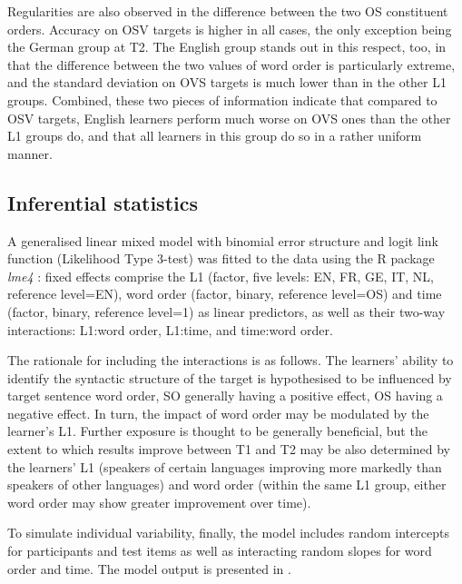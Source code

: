 Regularities are also observed in the difference between the two OS constituent orders. Accuracy on OSV targets is higher in all cases, the only exception being the German group at T2. The English group stands out in this respect, too, in that the difference between the two values of word order is particularly extreme, and the standard deviation on OVS targets is much lower than in the other L1 groups. Combined, these two pieces of information indicate that compared to OSV targets, English learners perform much worse on OVS ones than the other L1 groups do, and that all learners in this group do so in a rather uniform manner. 

\subsection{Inferential statistics}\label{sec:05:2.2}

A generalised linear mixed model with binomial error structure and logit link function (Likelihood Type 3-test) was fitted to the data using the R package \textit{lme4} \citep{BatesEtAl2015}: fixed effects comprise the L1 (factor, five levels: EN, FR, GE, IT, NL, reference level=EN), word order (factor, binary, reference level=OS) and time (factor, binary, reference level=1) as linear predictors, as well as their two-way interactions: L1:word order, L1:time, and time:word order. 

The rationale for including the interactions is as follows. The learners' ability to identify the syntactic structure of the target is hypothesised to be influenced by target sentence word order, SO generally having a positive effect, OS having a negative effect. In turn, the impact of word order may be modulated by the learner’s L1. Further exposure is thought to be generally beneficial, but the extent to which results improve between T1 and T2 may be also determined by the learners’ L1 (speakers of certain languages improving more markedly than speakers of other languages) and word order (within the same L1 group, either word order may show greater improvement over time). 

To simulate individual variability, finally, the model includes random intercepts for participants and test items as well as interacting random slopes for word order and time. The model output is presented in .

